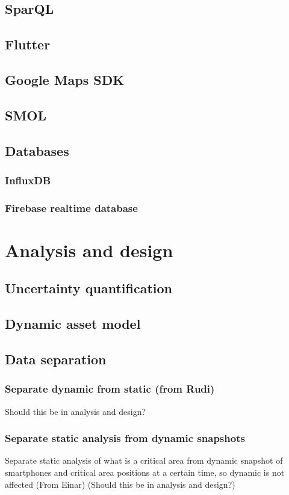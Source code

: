 \documentclass{article}
\begin{document}
\subsection{SparQL}
\subsection{Flutter}
\subsection{Google Maps SDK}
\subsection{SMOL}
\subsection{Databases}
\subsubsection{InfluxDB}
\subsubsection{Firebase realtime database}


\newpage
\section{Analysis and design}\label{sec:Analysis}
\subsection{Uncertainty quantification}
\subsection{Dynamic asset model}
\subsection{Data separation}
\subsubsection{Separate dynamic from static (from Rudi)}
Should this be in analysis and design?
\subsubsection{Separate static analysis from dynamic snapshots}
Separate static analysis of what is a critical area from dynamic snapshot of smartphones and critical area positions at a certain time, so dynamic is not affected (From Einar) (Should this be in analysis and design?)
\end{document}
